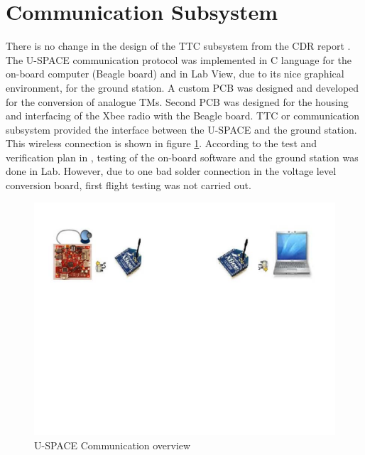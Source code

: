 

\section{Communication Subsystem}
There is no change in the design of the \ac{TTC} subsystem from the CDR report \cite{CDR_TTC}. The \ac{U-SPACE} communication protocol was implemented in C language for the on-board computer (Beagle board) and in Lab View, due to its nice graphical environment, for the ground station. A custom \ac{PCB} was designed and developed for the conversion of analogue \acp{TM}. Second \ac{PCB} was designed for the housing and interfacing of the Xbee radio with the Beagle board. \ac{TTC} or communication subsystem provided the interface between the \ac{U-SPACE} and the ground station. This wireless connection is shown in figure \ref{fig:com_setup}. According to the test and verification plan in \cite{CDR_TTC}, testing of the on-board software and the ground station was done in Lab. However, due to one bad solder connection in the voltage level conversion board, first flight testing was not carried out.
\begin{figure}[bht]
\centering
\includegraphics[scale=0.5]{figures/com_setup.pdf}
\caption[\ac{U-SPACE}Communication overview]{\ac{U-SPACE} Communication overview}
\label{fig:com_setup}
\end{figure}
%
